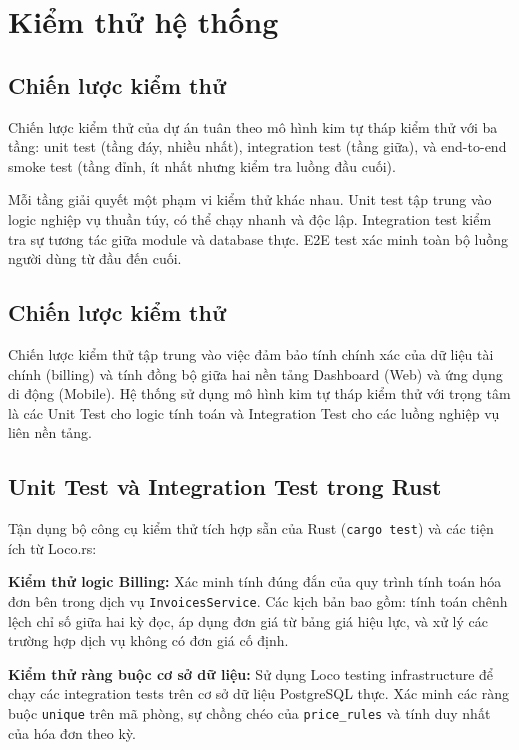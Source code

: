 \chapter{Kiểm thử hệ thống}\label{chapter_testing}

\section{Chiến lược kiểm thử}

Chiến lược kiểm thử của dự án tuân theo mô hình kim tự tháp kiểm thử với ba tầng: unit test (tầng đáy, nhiều nhất), integration test (tầng giữa), và end-to-end smoke test (tầng đỉnh, ít nhất nhưng kiểm tra luồng đầu cuối).

Mỗi tầng giải quyết một phạm vi kiểm thử khác nhau. Unit test tập trung vào logic nghiệp vụ thuần túy, có thể chạy nhanh và độc lập. Integration test kiểm tra sự tương tác giữa module và database thực. E2E test xác minh toàn bộ luồng người dùng từ đầu đến cuối.

\section{Chiến lược kiểm thử}

Chiến lược kiểm thử tập trung vào việc đảm bảo tính chính xác của dữ liệu tài chính (billing) và tính đồng bộ giữa hai nền tảng Dashboard (Web) và ứng dụng di động (Mobile). Hệ thống sử dụng mô hình kim tự tháp kiểm thử với trọng tâm là các Unit Test cho logic tính toán và Integration Test cho các luồng nghiệp vụ liên nền tảng.

\section{Unit Test và Integration Test trong Rust}

Tận dụng bộ công cụ kiểm thử tích hợp sẵn của Rust (\texttt{cargo test}) và các tiện ích từ Loco.rs:

\textbf{Kiểm thử logic Billing:} Xác minh tính đúng đắn của quy trình tính toán hóa đơn bên trong dịch vụ \texttt{InvoicesService}. Các kịch bản bao gồm: tính toán chênh lệch chỉ số giữa hai kỳ đọc, áp dụng đơn giá từ bảng giá hiệu lực, và xử lý các trường hợp dịch vụ không có đơn giá cố định.

\textbf{Kiểm thử ràng buộc cơ sở dữ liệu:} Sử dụng Loco testing infrastructure để chạy các integration tests trên cơ sở dữ liệu PostgreSQL thực. Xác minh các ràng buộc \texttt{unique} trên mã phòng, sự chồng chéo của \texttt{price\_rules} và tính duy nhất của hóa đơn theo kỳ.

